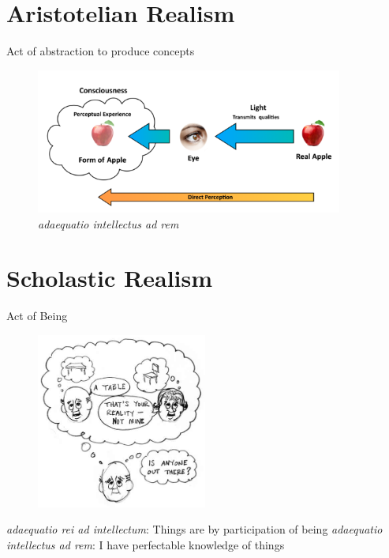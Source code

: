 \documentclass[xcolor=dvipsnames]{beamer}
\begin{document}
\section{Aristotelian Realism}


\begin{frame}{Act of abstraction to produce concepts}
  \begin{figure}
    \centering
    \includegraphics[width=0.9\textwidth]{aristotelian-realism}
    \caption {\emph{adaequatio intellectus ad rem}}
  \end{figure}
\end{frame}


\section{Scholastic Realism}


\begin{frame}{Act of Being}
  \begin{figure}
    \centering
    \includegraphics[width=0.5\textwidth]{scholastic-realism}
  \end{figure}
\emph{adaequatio rei ad intellectum}: Things are by participation of being
\emph{adaequatio intellectus ad rem}: I have perfectable knowledge of things
\end{frame}
\end{document}
